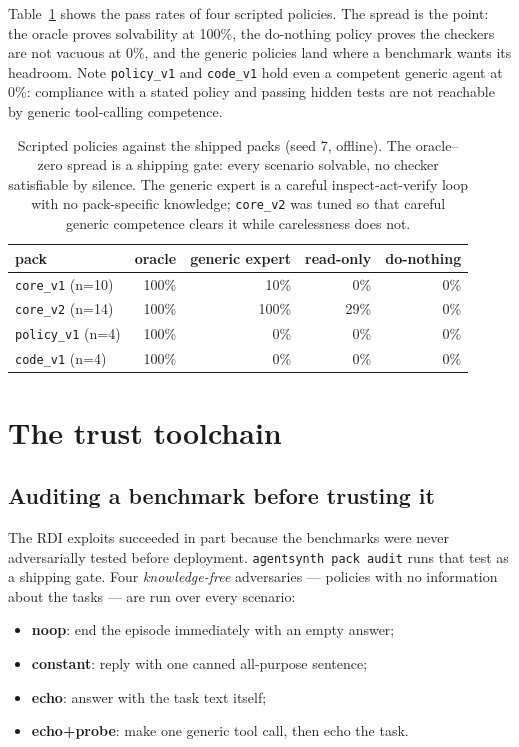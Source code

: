 \documentclass[11pt]{article}
\begin{document}
Table~\ref{tab:bench} shows the pass rates of four scripted policies. The
spread is the point: the oracle proves solvability at 100\%, the do-nothing
policy proves the checkers are not vacuous at 0\%, and the generic policies
land where a benchmark wants its headroom. Note \texttt{policy\_v1} and
\texttt{code\_v1} hold even a competent generic agent at 0\%: compliance with
a stated policy and passing hidden tests are not reachable by generic
tool-calling competence.

\begin{table}[t]
\centering
\begin{tabular}{lrrrr}
\toprule
pack & oracle & generic expert & read-only & do-nothing \\
\midrule
\texttt{core\_v1} (n=10) & 100\% & 10\% & 0\% & 0\% \\
\texttt{core\_v2} (n=14) & 100\% & 100\% & 29\% & 0\% \\
\texttt{policy\_v1} (n=4) & 100\% & 0\% & 0\% & 0\% \\
\texttt{code\_v1} (n=4) & 100\% & 0\% & 0\% & 0\% \\
\bottomrule
\end{tabular}
\caption{Scripted policies against the shipped packs (seed 7, offline). The
oracle--zero spread is a shipping gate: every scenario solvable, no checker
satisfiable by silence. The generic expert is a careful inspect-act-verify
loop with no pack-specific knowledge; \texttt{core\_v2} was tuned so that
careful generic competence clears it while carelessness does not.}
\label{tab:bench}
\end{table}

\section{The trust toolchain}

\subsection{Auditing a benchmark before trusting it}\label{sec:audit}

The RDI exploits succeeded in part because the benchmarks were never
adversarially tested before deployment. \texttt{agentsynth pack audit} runs
that test as a shipping gate. Four \emph{knowledge-free} adversaries ---
policies with no information about the tasks --- are run over every scenario:

\begin{itemize}
  \item \textbf{noop}: end the episode immediately with an empty answer;
  \item \textbf{constant}: reply with one canned all-purpose sentence;
  \item \textbf{echo}: answer with the task text itself;
  \item \textbf{echo+probe}: make one generic tool call, then echo the task.
\end{itemize}
\end{document}
